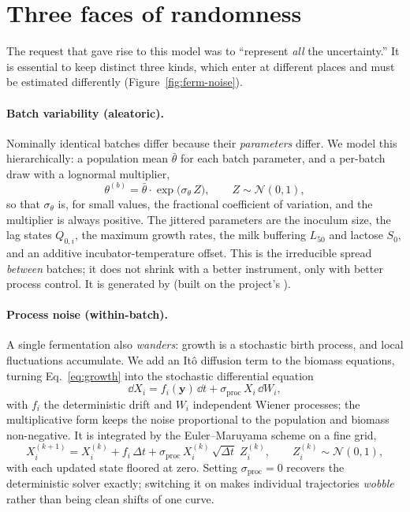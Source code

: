 \section{Three faces of randomness}
\label{sec:ferm-noise}

The request that gave rise to this model was to ``represent \emph{all} the
uncertainty.'' It is essential to keep distinct three kinds, which enter at
different places and must be estimated differently
(Figure~\ref{fig:ferm-noise}).

\paragraph{Batch variability (aleatoric).}
Nominally identical batches differ because their \emph{parameters} differ. We model
this hierarchically: a population mean $\bar\theta$ for each batch parameter, and a
per-batch draw with a lognormal multiplier,
%
\begin{equation}
\theta^{(b)} = \bar\theta \cdot \exp\!\bigl(\sigma_\theta\,Z\bigr),
\qquad Z\sim\mathcal N(0,1),
\label{eq:lognormal-jitter}
\end{equation}
%
so that $\sigma_\theta$ is, for small values, the fractional coefficient of
variation, and the multiplier is always positive. The jittered parameters are the
inoculum size, the lag states $Q_{0,i}$, the maximum growth rates, the milk
buffering $L_{50}$ and lactose $S_0$, and an additive incubator-temperature offset.
This is the irreducible spread \emph{between} batches; it does not shrink with a
better instrument, only with better process control. It is generated by
 (built on the project's
).

\paragraph{Process noise (within-batch).}
A single fermentation also \emph{wanders}: growth is a stochastic birth process,
and local fluctuations accumulate. We add an It\^o diffusion term to the biomass
equations, turning Eq.~\eqref{eq:growth} into the stochastic differential equation
%
\begin{equation}
\dd X_i = f_i(\bm y)\,\dd t + \sigma_{\mathrm{proc}}\,X_i\,\dd W_i,
\label{eq:sde}
\end{equation}
%
with $f_i$ the deterministic drift and $W_i$ independent Wiener processes; the
multiplicative form keeps the noise proportional to the population and biomass
non-negative. It is integrated by the Euler--Maruyama scheme on a fine grid,
%
\begin{equation}
X_i^{(k+1)} = X_i^{(k)} + f_i\,\Delta t
 + \sigma_{\mathrm{proc}}\,X_i^{(k)}\,\sqrt{\Delta t}\;Z_i^{(k)},
 \qquad Z_i^{(k)}\sim\mathcal N(0,1),
\label{eq:euler-maruyama}
\end{equation}
%
with each updated state floored at zero. Setting $\sigma_{\mathrm{proc}}=0$
recovers the deterministic solver exactly; switching it on makes individual
trajectories \emph{wobble} rather than being clean shifts of one curve.

